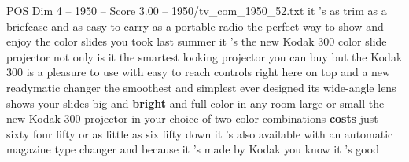 \begin{textsample}{POS Dim 4 – 1950 – Score 3.00 – 1950/tv\_com\_1950\_52.txt}  \label{ex:f4_pos_086}
it 's as trim as a briefcase and as easy to carry as a portable radio the perfect way to show and enjoy the color slides you took last summer it 's the new Kodak 300 color slide projector not only is it the smartest looking projector you can buy but the Kodak 300 is a pleasure to use with easy to reach controls right here on top and a new readymatic changer the smoothest and simplest ever designed its wide-angle lens shows your slides big and \textbf{bright} and full color in any room large or small the new Kodak 300 projector in your choice of two color combinations \textbf{costs} just sixty four fifty or as little as six fifty down it 's also available with an automatic magazine type changer and because it 's made by Kodak you know it 's good

\end{textsample}
